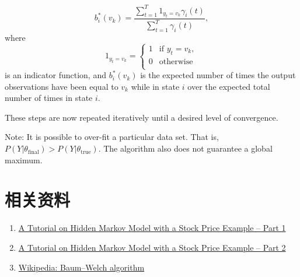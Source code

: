 \[
    b_{i}^{*}(v_{k})={\frac {\sum_{t=1}^{T}1_{y_{t}=v_{k}}\gamma_{i}(t)}{\sum_{t=1}^{T}\gamma_{i}(t)}},
\]
where
\[
    1_{y_{t}=v_{k}}={\begin{cases}
                        1&{\text{if }} y_{t}=v_{k},\\
                        0&{\text{otherwise}}\\
                     \end{cases}}
\]
is an indicator function, and
$b_{i}^{*}(v_{k})$ is the expected number of times the output observations have been equal to
$v_{k}$ while in state $i$ over the expected total number of times in state $i$.

These steps are now repeated iteratively until a desired level of convergence.

Note:
It is possible to over-fit a particular data set. That is, $P(Y|\theta _{\text{final}})>P(Y|\theta _{\text{true}})$.
The algorithm also does not guarantee a global maximum.

\section{相关资料}

\begin{enumerate}
    \item \href{https://codefying.com/2016/09/15/a-tutorial-on-hidden-markov-model-with-a-stock-price-example/}{A Tutorial on Hidden Markov Model with a Stock Price Example – Part 1}
    \item \href{https://codefying.com/2016/09/19/a-tutorial-on-hidden-markov-model-with-a-stock-price-example-part-2/}{A Tutorial on Hidden Markov Model with a Stock Price Example – Part 2}
    \item \href{https://en.wikipedia.org/wiki/Baum–Welch_algorithm}{Wikipedia: Baum–Welch algorithm}
\end{enumerate}

\ifx\mlnotes\undefined
    
\fi
